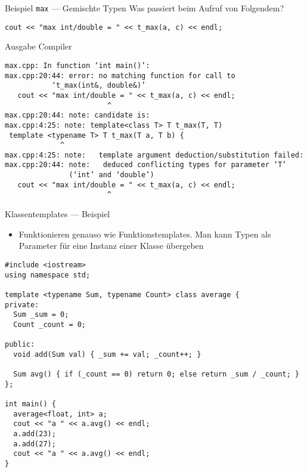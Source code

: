 \documentclass[presentation]{beamer}
\begin{document}
\begin{frame}[label={sec:org077a881},fragile]{Beispiel {\color{solarizedYellow}\texttt{max}} --- Gemischte Typen}
 Was passiert beim Aufruf von Folgendem?
\begin{verbatim}
cout << "max int/double = " << t_max(a, c) << endl;
\end{verbatim}
\begin{block}{Ausgabe Compiler}
\begin{verbatim}
max.cpp: In function ‘int main()’:
max.cpp:20:44: error: no matching function for call to 
	       ‘t_max(int&, double&)’
   cout << "max int/double = " << t_max(a, c) << endl;
					    ^
max.cpp:20:44: note: candidate is:
max.cpp:4:25: note: template<class T> T t_max(T, T)
 template <typename T> T t_max(T a, T b) {
			 ^
max.cpp:4:25: note:   template argument deduction/substitution failed:
max.cpp:20:44: note:   deduced conflicting types for parameter ‘T’ 
		       (‘int’ and ‘double’)
   cout << "max int/double = " << t_max(a, c) << endl;
					    ^
\end{verbatim}
\end{block}
\end{frame}
\begin{frame}[label={sec:org06f8e2c},fragile]{Klassentemplates --- Beispiel}
 \begin{itemize}
\item Funktionieren genauso wie Funktionstemplates. Man kann Typen als
Parameter für \alert{eine Instanz einer Klasse} übergeben
\end{itemize}
\begin{verbatim}
#include <iostream>
using namespace std;

template <typename Sum, typename Count> class average {
private:
  Sum _sum = 0;
  Count _count = 0;

public:
  void add(Sum val) { _sum += val; _count++; }

  Sum avg() { if (_count == 0) return 0; else return _sum / _count; }
};

int main() {
  average<float, int> a;
  cout << "a " << a.avg() << endl;
  a.add(23);
  a.add(27);
  cout << "a " << a.avg() << endl;
}
\end{verbatim}
\end{frame}
\end{document}
